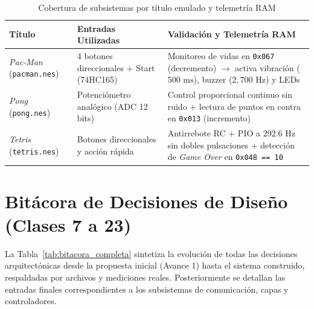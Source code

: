 \documentclass[conference]{IEEEtran}
\begin{document}
\begin{table}[H]
	\centering
	\caption{Cobertura de subsistemas por título emulado y telemetría RAM}
	\label{tab:juegos_prueba}
	\footnotesize
	\begin{tabular}{|p{1.4cm}|p{2.5cm}|p{3.3cm}|}
		\hline
		\textbf{Título} & \textbf{Entradas Utilizadas} & \textbf{Validación y Telemetría RAM} \\
		\hline
		\textit{Pac-Man} (\texttt{pacman.nes}) & 4 botones direccionales + Start (74HC165) & Monitoreo de vidas en \texttt{0x067} (decremento) $\rightarrow$ activa vibración ($500\text{ ms}$), buzzer ($2{,}700\text{ Hz}$) y LEDs \\
		\hline
		\textit{Pong} (\texttt{pong.nes}) & Potenciómetro analógico (ADC 12 bits) & Control proporcional continuo sin ruido + lectura de puntos en contra en \texttt{0x013} (incremento) \\
		\hline
		\textit{Tetris} (\texttt{tetris.nes}) & Botones direccionales y acción rápida & Antirrebote RC + PIO a $292.6\text{ Hz}$ sin dobles pulsaciones + detección de \textit{Game Over} en \texttt{0x048 == 10} \\
		\hline
	\end{tabular}
\end{table}


\section{Bitácora de Decisiones de Diseño (Clases 7 a 23)}

La Tabla~\ref{tab:bitacora_completa} sintetiza la evolución de todas las decisiones arquitectónicas desde la propuesta inicial (Avance 1) hasta el sistema construido, respaldadas por archivos y mediciones reales. Posteriormente se detallan las entradas finales correspondientes a los subsistemas de comunicación, capas y controladores.
\end{document}
